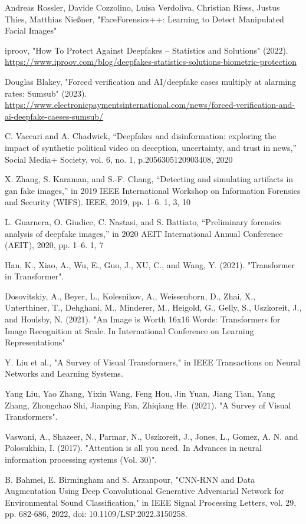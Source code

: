 \begin{thebibliography}{99}

     Andreas Rossler, Davide Cozzolino, Luisa Verdoliva, Christian Riess, Justus Thies, Matthias Nießner, "FaceForensics++: Learning to Detect Manipulated Facial Images"

     iproov, "How To Protect Against Deepfakes – Statistics and Solutions" (2022). \url{https://www.iproov.com/blog/deepfakes-statistics-solutions-biometric-protection}
    
     Douglas Blakey, "Forced verification and AI/deepfake cases multiply at alarming rates: Sumsub" (2023). \url{https://www.electronicpaymentsinternational.com/news/forced-verification-and-ai-deepfake-caeses-sumsub/}

     C. Vaccari and A. Chadwick, “Deepfakes and disinformation: exploring the impact of synthetic political video on deception, uncertainty, and trust in news,” Social Media+ Society, vol. 6, no. 1, p.2056305120903408, 2020
    
     X. Zhang, S. Karaman, and S.-F. Chang, “Detecting and simulating artifacts in gan fake images,” in 2019 IEEE International Workshop on Information Forensics and Security (WIFS). IEEE, 2019, pp. 1–6. 1, 3, 10
    
      L. Guarnera, O. Giudice, C. Nastasi, and S. Battiato, “Preliminary forensics analysis of deepfake images,” in 2020 AEIT International Annual Conference (AEIT), 2020, pp. 1–6. 1, 7

     Han, K., Xiao, A., Wu, E., Guo, J., XU, C., and Wang, Y. (2021). "Transformer in Transformer".
    
     Dosovitskiy, A., Beyer, L., Kolesnikov, A., Weissenborn, D., Zhai, X., Unterthiner, T., Dehghani, M., Minderer, M., Heigold, G., Gelly, S., Uszkoreit, J., and Houlsby, N. (2021). "An Image is Worth 16x16 Words: Transformers for Image Recognition at Scale. In International Conference on Learning Representations"

     Y. Liu et al., "A Survey of Visual Transformers," in IEEE Transactions on Neural Networks and Learning Systems.

     Yang Liu, Yao Zhang, Yixin Wang, Feng Hou, Jin Yuan,
    Jiang Tian, Yang Zhang, Zhongchao Shi, Jianping Fan, Zhiqiang He. (2021). "A Survey of Visual Transformers".

     Vaswani, A., Shazeer, N., Parmar, N., Uszkoreit, J., Jones, L., Gomez, A. N. and Polosukhin, I. (2017). "Attention is all you need. In Advances in neural information processing systems (Vol. 30)".

     B. Bahmei, E. Birmingham and S. Arzanpour, "CNN-RNN and Data Augmentation Using Deep Convolutional Generative Adversarial Network for Environmental Sound Classification," in IEEE Signal Processing Letters, vol. 29, pp. 682-686, 2022, doi: 10.1109/LSP.2022.3150258.

\end{thebibliography}
